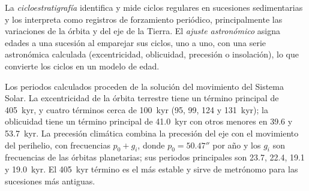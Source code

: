 \begin{definition}\label{def:b3:sequence-stratigraphy:cyclo}
La \emph{cicloestratigrafía} identifica y mide
ciclos regulares en sucesiones sedimentarias y los interpreta como registros de
forzamiento periódico, principalmente las variaciones de la órbita y del eje de la Tierra.
El \emph{ajuste astronómico} asigna edades a una
sucesión al emparejar sus ciclos, uno a uno, con una serie astronómica calculada
(excentricidad, oblicuidad, precesión o insolación), lo que convierte los
ciclos en un modelo de edad.
\end{definition}

Los periodos calculados proceden de la solución del movimiento del Sistema Solar.
La excentricidad de la órbita terrestre tiene un término principal de \qty{405}{kyr}, y
cuatro términos cerca de \qty{100}{kyr} (95, 99, 124 y \qty{131}{kyr}); la
oblicuidad tiene un término principal de \qty{41.0}{kyr} con otros menores en 39.6 y
\qty{53.7}{kyr}. La precesión climática combina la precesión del eje
con el movimiento del perihelio, con frecuencias $p_0 + g_i$, donde $p_0 =
50.47''$ por año y los $g_i$ son frecuencias de las órbitas planetarias; sus
periodos principales son 23.7, 22.4, 19.1 y \qty{19.0}{kyr}. El \qty{405}{kyr}
término es el más estable y sirve de metrónomo para las sucesiones más antiguas.

